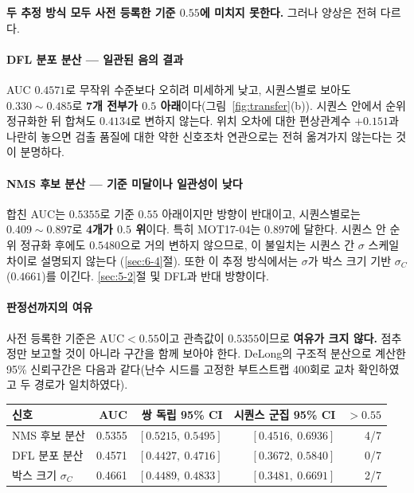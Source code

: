 \documentclass[12pt,a4paper,oneside]{report}
\begin{document}
\textbf{두 추정 방식 모두 사전 등록한 기준 $0.55$에 미치지 못한다.} 그러나 양상은 전혀 다르다.

\paragraph{DFL 분포 분산 --- 일관된 음의 결과} AUC $0.4571$로 무작위 수준보다 오히려 미세하게 낮고, 시퀀스별로 보아도 $0.330 \sim 0.485$로 \textbf{7개 전부가 $0.5$ 아래}이다(그림~\ref{fig:transfer}(b)). 시퀀스 안에서 순위 정규화한 뒤 합쳐도 $0.4134$로 변하지 않는다. 위치 오차에 대한 편상관계수 $+0.151$과 나란히 놓으면 검출 품질에 대한 약한 신호조차 연관으로는 전혀 옮겨가지 않는다는 것이 분명하다.

\paragraph{NMS 후보 분산 --- 기준 미달이나 일관성이 낮다} 합친 AUC는 $0.5355$로 기준 $0.55$ 아래이지만 방향이 반대이고, 시퀀스별로는 $0.409 \sim 0.897$로 \textbf{4개가 $0.5$ 위}이다. 특히 MOT17-04는 $0.897$에 달한다. 시퀀스 안 순위 정규화 후에도 $0.5480$으로 거의 변하지 않으므로, 이 불일치는 시퀀스 간 $\sigma$ 스케일 차이로 설명되지 않는다 (\ref{sec:6-4}절). 또한 이 추정 방식에서는 $\sigma$가 박스 크기 기반 $\sigma_C$($0.4661$)를 이긴다. \ref{sec:5-2}절 및 DFL과 반대 방향이다.

\paragraph{판정선까지의 여유} 사전 등록한 기준은 $\mathrm{AUC} < 0.55$이고 관측값이 $0.5355$이므로 \textbf{여유가 크지 않다.} 점추정만 보고할 것이 아니라 구간을 함께 보아야 한다. DeLong의 구조적 분산으로 계산한 95\% 신뢰구간은 다음과 같다(난수 시드를 고정한 부트스트랩 400회로 교차 확인하였고 두 경로가 일치하였다).

\begin{center}
\small
\begin{tabular}{lrrrr}
\toprule
\textbf{신호} & AUC & 쌍 독립 95\% CI & 시퀀스 군집 95\% CI & $>0.55$ \\
\midrule
NMS 후보 분산 & 0.5355 & $[0.5215,\ 0.5495]$ & $[0.4516,\ \mathbf{0.6936}]$ & 4/7 \\
DFL 분포 분산 & 0.4571 & $[0.4427,\ 0.4716]$ & $[0.3672,\ 0.5840]$ & 0/7 \\
박스 크기 $\sigma_C$ & 0.4661 & $[0.4489,\ 0.4833]$ & $[0.3481,\ 0.6691]$ & 2/7 \\
\bottomrule
\end{tabular}
\end{center}
\end{document}
